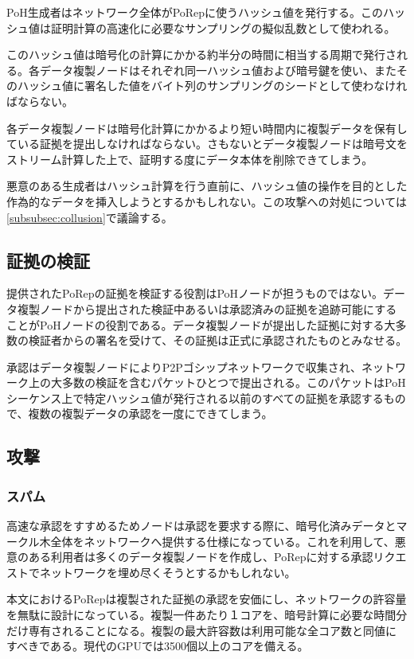 \documentclass[12pt]{ltjsarticle}
\begin{document}
PoH生成者はネットワーク全体がPoRepに使うハッシュ値を発行する。このハッシュ値は証明計算の高速化に必要なサンプリングの擬似乱数として使われる。

このハッシュ値は暗号化の計算にかかる約半分の時間に相当する周期で発行される。各データ複製ノードはそれぞれ同一ハッシュ値および暗号鍵を使い、またそのハッシュ値に署名した値をバイト列のサンプリングのシードとして使わなければならない。

各データ複製ノードは暗号化計算にかかるより短い時間内に複製データを保有している証拠を提出しなければならない。さもないとデータ複製ノードは暗号文をストリーム計算した上で、証明する度にデータ本体を削除できてしまう。

悪意のある生成者はハッシュ計算を行う直前に、ハッシュ値の操作を目的とした作為的なデータを挿入しようとするかもしれない。この攻撃への対処については\ref{subsubsec:collusion}で議論する。

\subsection{証拠の検証}
提供されたPoRepの証拠を検証する役割はPoHノードが担うものではない。データ複製ノードから提出された検証中あるいは承認済みの証拠を追跡可能にすることがPoHノードの役割である。データ複製ノードが提出した証拠に対する大多数の検証者からの署名を受けて、その証拠は正式に承認されたものとみなせる。

承認はデータ複製ノードによりP2Pゴシップネットワークで収集され、ネットワーク上の大多数の検証を含むパケットひとつで提出される。このパケットはPoHシーケンス上で特定ハッシュ値が発行される以前のすべての証拠を承認するもので、複数の複製データの承認を一度にできてしまう。

\subsection{攻撃}
\subsubsection{スパム}
高速な承認をすすめるためノードは承認を要求する際に、暗号化済みデータとマークル木全体をネットワークへ提供する仕様になっている。これを利用して、悪意のある利用者は多くのデータ複製ノードを作成し、PoRepに対する承認リクエストでネットワークを埋め尽くそうとするかもしれない。

本文におけるPoRepは複製された証拠の承認を安価にし、ネットワークの許容量を無駄に設計になっている。複製一件あたり１コアを、暗号計算に必要な時間分だけ専有されることになる。複製の最大許容数は利用可能な全コア数と同値にすべきである。現代のGPUでは3500個以上のコアを備える。
\end{document}
